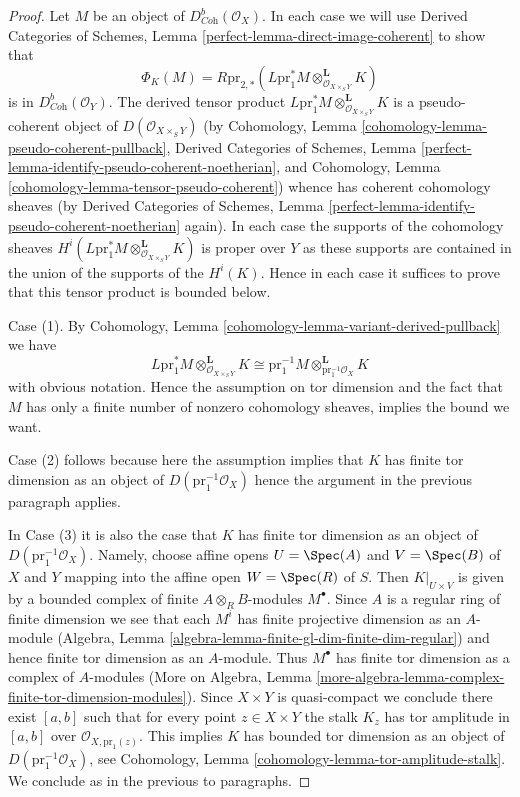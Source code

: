 \begin{proof}
Let $M$ be an object of $D^b_{\textit{Coh}}(\mathcal{O}_X)$.
In each case we will use Derived Categories of Schemes, Lemma
\ref{perfect-lemma-direct-image-coherent} to show that
$$
\Phi_K(M) = R\text{pr}_{2, *}(
L\text{pr}_1^*M
\otimes_{\mathcal{O}_{X \times_S Y}}^\mathbf{L}
K)
$$
is in $D^b_{\textit{Coh}}(\mathcal{O}_Y)$. The derived tensor product
$L\text{pr}_1^*M \otimes_{\mathcal{O}_{X \times_S Y}}^\mathbf{L} K$
is a pseudo-coherent object of $D(\mathcal{O}_{X \times_S Y})$
(by
Cohomology, Lemma \ref{cohomology-lemma-pseudo-coherent-pullback},
Derived Categories of Schemes, Lemma
\ref{perfect-lemma-identify-pseudo-coherent-noetherian}, and
Cohomology, Lemma \ref{cohomology-lemma-tensor-pseudo-coherent})
whence has coherent cohomology sheaves (by
Derived Categories of Schemes, Lemma
\ref{perfect-lemma-identify-pseudo-coherent-noetherian} again).
In each case the supports of the cohomology sheaves
$H^i(L\text{pr}_1^*M \otimes_{\mathcal{O}_{X \times_S Y}}^\mathbf{L} K)$
is proper over $Y$ as these supports are contained in the
union of the supports of the $H^i(K)$. Hence in each case
it suffices to prove that this tensor product is bounded below.

\medskip\noindent
Case (1). By Cohomology, Lemma \ref{cohomology-lemma-variant-derived-pullback}
we have
$$
L\text{pr}_1^*M
\otimes_{\mathcal{O}_{X \times_S Y}}^\mathbf{L}
K
\cong
\text{pr}_1^{-1}M
\otimes_{\text{pr}_1^{-1}\mathcal{O}_X}^\mathbf{L}
K
$$
with obvious notation. Hence the assumption on tor dimension
and the fact that $M$ has only a finite number of nonzero
cohomology sheaves, implies the bound we want.

\medskip\noindent
Case (2) follows because here the assumption implies that $K$ has
finite tor dimension as an object of $D(\text{pr}_1^{-1}\mathcal{O}_X)$
hence the argument in the previous paragraph applies.

\medskip\noindent
In Case (3) it is also the case that $K$ has finite tor dimension
as an object of $D(\text{pr}_1^{-1}\mathcal{O}_X)$. Namely, choose
affine opens $U = \Spec(A)$ and $V = \Spec(B)$ of $X$ and $Y$ mapping into the
affine open $W = \Spec(R)$ of $S$. Then
$K|_{U \times V}$ is given by a bounded complex of finite
$A \otimes_R B$-modules $M^\bullet$. Since $A$ is a regular ring
of finite dimension we see that each $M^i$ has finite projective dimension
as an $A$-module (Algebra, Lemma
\ref{algebra-lemma-finite-gl-dim-finite-dim-regular})
and hence finite tor dimension as an $A$-module.
Thus $M^\bullet$ has finite tor dimension as a complex of $A$-modules
(More on Algebra, Lemma
\ref{more-algebra-lemma-complex-finite-tor-dimension-modules}).
Since $X \times Y$ is quasi-compact we conclude there exist $[a, b]$
such that for every point $z \in X \times Y$ the stalk $K_z$
has tor amplitude in $[a, b]$ over $\mathcal{O}_{X, \text{pr}_1(z)}$.
This implies $K$ has bounded tor dimension as an object of
$D(\text{pr}_1^{-1}\mathcal{O}_X)$, see
Cohomology, Lemma \ref{cohomology-lemma-tor-amplitude-stalk}.
We conclude as in the previous to paragraphs.


\end{proof}
